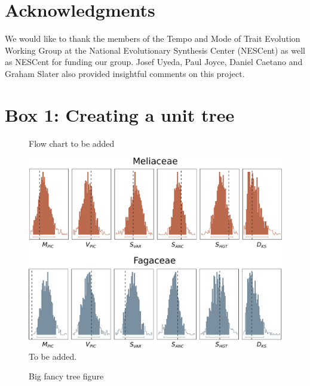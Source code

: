 \documentclass[a4paper,12pt]{article}
\begin{document}
\section{Acknowledgments}
We would like to thank the members of the Tempo and Mode of Trait Evolution Working Group at the National Evolutionary Synthesis Center (NESCent) as well as NESCent for funding our group. Josef Uyeda, Paul Joyce, Daniel Caetano and Graham Slater also provided insightful comments on this project.

\newpage
\section{Box 1: Creating a unit tree}
\vfill

\newpage



\begin{figure}[p]
  \centering
  \caption{Flow chart to be added}
  \label{fig:flowchart}
\end{figure}

\begin{figure}[p]
  \centering
  \includegraphics[scale=0.65]{figs/two-clade-example}
  \caption{To be added.}
  \label{fig:two-clades}
\end{figure}

\begin{figure}[p]
  \centering
  \caption{Big fancy tree figure}
  \label{fig:angio-phylogeny}
\end{figure}
\end{document}
